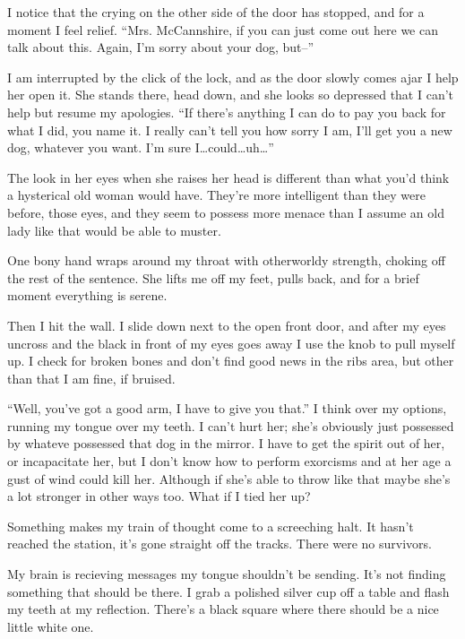 I notice that the crying on the other side of the door has stopped,
and for a moment I feel relief. ``Mrs. McCannshire, if you can just
come out here we can talk about this. Again, I'm sorry about your
dog, but--''



I am interrupted by the click of the lock, and as the door slowly
comes ajar I help her open it. She stands there, head down, and she
looks so depressed that I can't help but resume my apologies. ``If
there's anything I can do to pay you back for what I did, you name
it. I really can't tell you how sorry I am, I'll get you a new dog,
whatever you want. I'm sure I{\ldots}could{\ldots}uh{\ldots}''



The look in her eyes when she raises her head is different than
what you'd think a hysterical old woman would have. They're more
intelligent than they were before, those eyes, and they seem to
possess more menace than I assume an old lady like that would be
able to muster.



One bony hand wraps around my throat with otherworldy strength,
choking off the rest of the sentence. She lifts me off my feet,
pulls back, and for a brief moment everything is serene.



Then I hit the wall. I slide down next to the open front door, and
after my eyes uncross and the black in front of my eyes goes away I
use the knob to pull myself up. I check for broken bones and don't
find good news in the ribs area, but other than that I am fine, if
bruised.



``Well, you've got a good arm, I have to give you that.'' I think
over my options, running my tongue over my teeth. I can't hurt her;
she's obviously just possessed by whateve possessed that dog in the
mirror. I have to get the spirit out of her, or incapacitate her,
but I don't know how to perform exorcisms and at her age a gust of
wind could kill her. Although if she's able to throw like that
maybe she's a lot stronger in other ways too. What if I tied her
up?



Something makes my train of thought come to a screeching halt. It
hasn't reached the station, it's gone straight off the tracks.
There were no survivors.



My brain is recieving messages my tongue shouldn't be sending. It's
not finding something that should be there. I grab a polished
silver cup off a table and flash my teeth at my reflection. There's
a black square where there should be a nice little white one.



